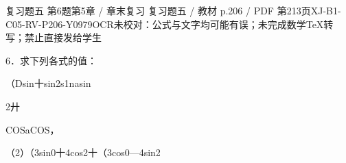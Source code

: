 \begin{bankitem}{复习题五 第6题}{第5章 / 章末复习 复习题五 / 教材 p.206 / PDF 第213页}{XJ-B1-C05-RV-P206-Y0979}{OCR未校对：公式与文字均可能有误；未完成数学TeX转写；禁止直接发给学生}
\begin{ocrdraft}
\par
6．求下列各式的值：
\par
（Dsin十sin2s1nasin
\par
2廾
\par
COSaCOS，
\par
（2）（3sin0十4cos2十（3cos0—4sin2
\end{ocrdraft}
\end{bankitem}
